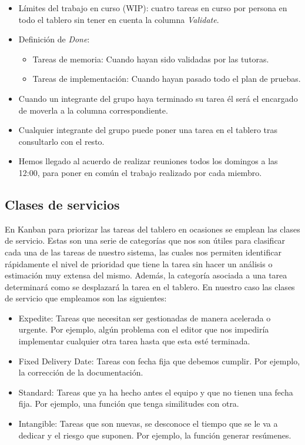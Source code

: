 \begin{itemize}
    \item Límites del trabajo en curso (WIP): cuatro tareas en curso por persona en todo el tablero sin tener en cuenta la columna \textit{Validate}.
    \item Definición de \textit{Done}:
          \begin{itemize}
              \item Tareas de memoria: Cuando hayan sido validadas por las tutoras.
              \item Tareas de implementación: Cuando hayan pasado todo el plan de pruebas.
          \end{itemize}
    \item Cuando un integrante del grupo haya terminado su tarea él será el encargado de moverla a la columna correspondiente.
    \item Cualquier integrante del grupo puede poner una tarea en el tablero tras consultarlo con el resto.
    \item Hemos llegado al acuerdo de realizar reuniones todos los domingos a las 12:00, para poner en común el trabajo realizado por cada miembro.
\end{itemize}

\subsection{Clases de servicios}
\label{claseDeServicio}
En Kanban para priorizar las tareas del tablero en ocasiones se emplean las clases de servicio. Estas son una serie de categorías que nos son útiles para clasificar cada una de las tareas de nuestro sistema, las cuales nos permiten identificar rápidamente el nivel de prioridad que tiene la tarea sin hacer un análisis o estimación muy extensa del mismo. Además, la categoría asociada a una tarea determinará como se desplazará la tarea en el tablero. En nuestro caso las clases de servicio que empleamos son las siguientes:
\begin{itemize}
    \item Expedite: Tareas que necesitan ser gestionadas de manera acelerada o urgente. Por ejemplo, algún problema con el editor que nos impediría implementar cualquier otra tarea hasta que esta esté terminada.
    \item Fixed Delivery Date: Tareas con fecha fija que debemos cumplir. Por ejemplo, la corrección de la documentación.
    \item Standard: Tareas que ya ha hecho antes el equipo y que no tienen una fecha fija. Por ejemplo, una función que tenga similitudes con otra.
    \item Intangible: Tareas que son nuevas, se desconoce el tiempo que se le va a dedicar y el riesgo que suponen. Por ejemplo, la función generar resúmenes.
\end{itemize}

